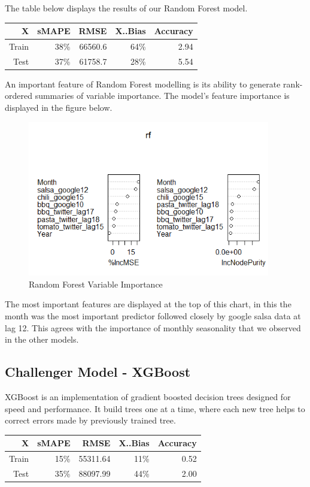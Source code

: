 \documentclass[12pt,oneside]{chicagocapstone}
\begin{document}
The table below displays the results of our Random Forest model.
\begin{longtable}[]{@{}rrrrr@{}}
\toprule
X & sMAPE & RMSE & X..Bias & Accuracy\tabularnewline
\midrule
\endhead
Train & 38\% & 66560.6 & 64\% & 2.94\tabularnewline
Test & 37\% & 61758.7 & 28\% & 5.54\tabularnewline
\bottomrule
\end{longtable}
An important feature of Random Forest modelling is its ability to
generate rank-ordered summaries of variable importance. The model's
feature importance is displayed in the figure below.
\begin{figure}

{\centering \includegraphics[width=400px]{figure/RF_V_Imp} 

}

\caption{Random Forest Variable Importance}\label{fig:rf-v-imp}
\end{figure}
The most important features are displayed at the top of this chart, in
this the month was the most important predictor followed closely by
google salsa data at lag 12. This agrees with the importance of monthly
seasonality that we observed in the other models.

\subsection*{Challenger Model - XGBoost}\label{findings-XGBoost}

XGBoost is an implementation of gradient boosted decision trees designed
for speed and performance. It build trees one at a time, where each new
tree helps to correct errors made by previously trained tree.
\begin{longtable}[]{@{}rrrrr@{}}
\toprule
X & sMAPE & RMSE & X..Bias & Accuracy\tabularnewline
\midrule
\endhead
Train & 15\% & 55311.64 & 11\% & 0.52\tabularnewline
Test & 35\% & 88097.99 & 44\% & 2.00\tabularnewline
\bottomrule
\end{longtable}
\end{document}
